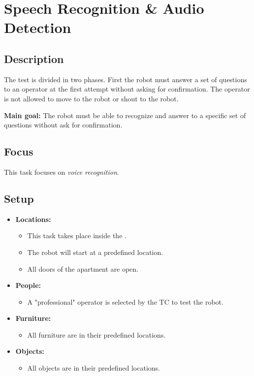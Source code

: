 \section{Speech Recognition \& Audio Detection}
\label{test:speech-recognition-audio-detection}

\subsection*{Description}
The test is divided in two phases. First the robot must answer a set of questions to an operator at the first attempt without asking for confirmation. The operator is not allowed to move to the robot or shout to the robot.

\noindent \textbf{Main goal:}
The robot must be able to recognize and answer to a specific set of questions without ask for confirmation.


\subsection*{Focus}
This task focuses on
\textit{voice recognition}.

\subsection*{Setup}
\begin{itemize}[nosep]	
	\item \textbf{Locations:} 
	\begin{itemize}
		\item This task takes place inside the \Arena{}.
		\item The robot will start at a predefined location.
		\item All doors of the apartment are open.
	\end{itemize}	 
	\item \textbf{People:} 
	\begin{itemize}
		\item A "professional" operator is selected by the TC to test the robot.
	\end{itemize}
	\item \textbf{Furniture:} 
	\begin{itemize}
		\item All furniture are in their predefined locations.
	\end{itemize}
    \item \textbf{Objects:} 
    \begin{itemize}
		\item All objects are in their predefined locations.
	\end{itemize}
\end{itemize}

